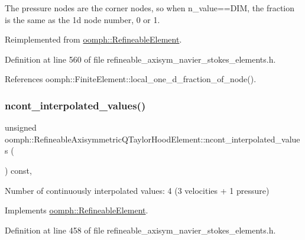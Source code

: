 The pressure nodes are the corner nodes, so when n\+\_\+value==D\+IM, the fraction is the same as the 1d node number, 0 or 1. 



Reimplemented from \hyperlink{classoomph_1_1RefineableElement_ac4e4ae5374154855ae9b072c6269f76e}{oomph\+::\+Refineable\+Element}.



Definition at line 560 of file refineable\+\_\+axisym\+\_\+navier\+\_\+stokes\+\_\+elements.\+h.



References oomph\+::\+Finite\+Element\+::local\+\_\+one\+\_\+d\+\_\+fraction\+\_\+of\+\_\+node().

\mbox{\label{classoomph_1_1RefineableAxisymmetricQTaylorHoodElement_af1fe431fc8cdb9df1533b58bef408c49}} 
\subsubsection{\texorpdfstring{ncont\+\_\+interpolated\+\_\+values()}{ncont\_interpolated\_values()}}
{\footnotesize\ttfamily unsigned oomph\+::\+Refineable\+Axisymmetric\+Q\+Taylor\+Hood\+Element\+::ncont\+\_\+interpolated\+\_\+values (\begin{DoxyParamCaption}{ }\end{DoxyParamCaption}) const\hspace{0.3cm}{\ttfamily [inline]}, {\ttfamily [virtual]}}



Number of continuously interpolated values\+: 4 (3 velocities + 1 pressure) 



Implements \hyperlink{classoomph_1_1RefineableElement_a53e171a18c9f43f1db90a6876516a073}{oomph\+::\+Refineable\+Element}.



Definition at line 458 of file refineable\+\_\+axisym\+\_\+navier\+\_\+stokes\+\_\+elements.\+h.

\mbox{\label{classoomph_1_1RefineableAxisymmetricQTaylorHoodElement_a637fff45cb50b55c9c05633321489b89}} 
